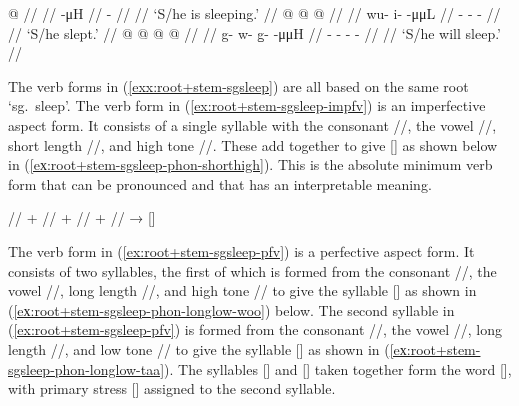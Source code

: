 \pex\label{exx:root+stem-sgsleep}%
\a\label{ex:root+stem-sgsleep-impfv}%
%
\begingl
	\gla	{} @ {} //
	\glp	\llap{[}\rlap{\ipa{\gm{tʰá}}]} {} //
	\glb	{} -μH //
	\glc	{} - //
	\gld	{} {} //
	\glft	‘S/he is sleeping.’
		//
\endgl
\a\label{ex:root+stem-sgsleep-pfv}%
%
\begingl
	\gla	{} @ {} @ {} @ {} //
	\glp	\llap{[}\rlap{\ipa{wùː.ˈ\gm{tʰàː}}]} {} {} {} //
	\glb	wu- i-  -μμL //
	\glc	{}- -  - //
	\gld	{} {} {} {} //
	\glft	‘S/he slept.’
		//
\endgl
\a\label{ex:root+stem-sgsleep-prsp}%
%
\begingl
	\gla	{} @ {} @ {} @ {} @ {} //
	\glp	\llap{[}\rlap{\ipa{kʷùː.qà.ˈ\gm{tʰáː}}]} {} {} {} {} //
	\glb	g- w- g̱-  -μμH //
	\glc	{}- - -  - //
	\gld	{} {} {} {} {} //
	\glft	‘S/he will sleep.’
		//
\endgl
\xe

The verb forms in (\ref{exx:root+stem-sgsleep}) are all based on the same root  ‘sg.\ sleep’. The verb form in (\ref{ex:root+stem-sgsleep-impfv}) is an imperfective aspect form. It consists of a single syllable with the consonant //, the vowel //, short length //, and high tone //. These add together to give [] as shown below in (\ref{eх:root+stem-sgsleep-phon-shorthigh}). This is the absolute minimum verb form that can be pronounced and that has an interpretable meaning.

\ex\label{eх:root+stem-sgsleep-phon-shorthigh}%
%
	// + // + // + //
	→ []
\xe

The verb form in (\ref{ex:root+stem-sgsleep-pfv}) is a perfective aspect form. It consists of two syllables, the first of which is formed from the consonant //, the vowel //, long length //, and high tone // to give the syllable [] as shown in (\ref{eх:root+stem-sgsleep-phon-longlow-woo}) below. The second syllable in (\ref{ex:root+stem-sgsleep-pfv}) is formed from the consonant //, the vowel //, long length //, and low tone // to give the syllable [] as shown in (\ref{eх:root+stem-sgsleep-phon-longlow-taa}). The syllables [] and [] taken together form the word [], with primary stress [] assigned to the second syllable.

